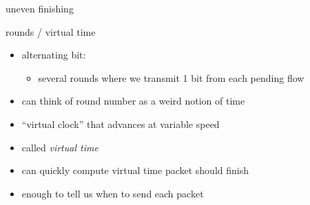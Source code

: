 \begin{frame}{uneven finishing}
\end{frame}

\begin{frame}{rounds / virtual time}
\begin{itemize}
\item alternating bit:
    \begin{itemize}
    \item several rounds where we transmit 1 bit from each pending flow
    \end{itemize}
\item can think of round number as a weird notion of time
\vspace{.5cm}
\item ``virtual clock'' that advances at variable speed 
\item called \textit{virtual time}
\vspace{.5cm}
\item<2-> can quickly compute virtual time packet should finish
\item<2-> enough to tell us when to send each packet
\end{itemize}
\end{frame}

